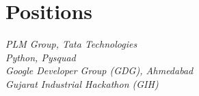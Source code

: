 \documentclass[]{deedy-resume-openfont}
\begin{document}
\begin{minipage}[t]{0.35\textwidth}
\section{Positions}
\footnotesize \textit{PLM Group, Tata Technologies}\\

\footnotesize \textit{Python, Pysquad}\\

\footnotesize \textit{Google Developer Group (GDG), Ahmedabad}\\

\footnotesize \textit{Gujarat Industrial Hackathon (GIH)}
\sectionsep



%
%

\end{minipage} 
\hfill
\end{document}
